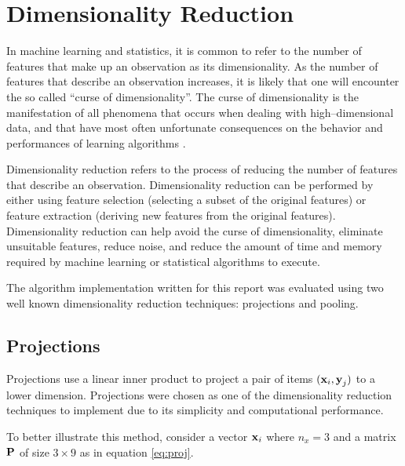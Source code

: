 \section{Dimensionality Reduction} \label{sect:theory:dim-reduction}
In machine learning and statistics, it is common to refer to the number of features that make up an observation as its dimensionality. As the number of features that describe an observation increases, it is likely that one will encounter the so called ``curse of dimensionality''. The curse of dimensionality is the manifestation of all phenomena that occurs when dealing with high--dimensional data, and that have most often unfortunate consequences on the behavior and performances of learning algorithms \cite{article:curse-of-dim}. \newline

Dimensionality reduction refers to the process of reducing the number of features that describe an observation. Dimensionality reduction can be performed by either using feature selection (selecting a subset of the original features) or feature extraction (deriving new features from the original features). Dimensionality reduction can help avoid the curse of dimensionality, eliminate unsuitable features, reduce noise, and reduce the amount of time and memory required by machine learning or statistical algorithms to execute. \newline

The \mlblink algorithm implementation written for this report was evaluated using two well known dimensionality reduction techniques: projections and pooling.

\subsection{Projections} \label{sect:theory:dim-reduction:proj}
Projections use a linear inner product to project a pair of items $(\boldsymbol{\mathbf{x}}_i, \boldsymbol{\mathbf{y}}_j)$ to a lower dimension. Projections were chosen as one of the dimensionality reduction techniques to implement due to its simplicity and computational performance. \newline

To better illustrate this method, consider a vector $\boldsymbol{\mathbf{x}}_i$ where $n_x=3$ and a matrix $\boldsymbol{\mathbf{P}}$ of size $3 \times 9$ as in equation \ref{eq:proj}.

